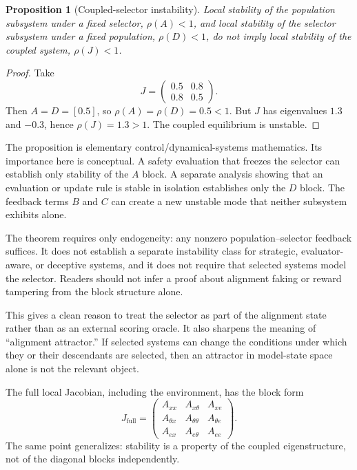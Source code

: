 \documentclass[11pt]{article}
\newtheorem{proposition}{Proposition}
\begin{document}
\begin{proposition}[Coupled-selector instability]
Local stability of the population subsystem under a fixed selector, $\rho(A)<1$, and local stability of the selector subsystem under a fixed population, $\rho(D)<1$, do not imply local stability of the coupled system, $\rho(J)<1$.
\end{proposition}

\begin{proof}
Take
\begin{equation}
    J=
    \begin{pmatrix}
    0.5 & 0.8\\
    0.8 & 0.5
    \end{pmatrix}.
\end{equation}
Then $A=D=[0.5]$, so $\rho(A)=\rho(D)=0.5<1$. But $J$ has eigenvalues $1.3$ and $-0.3$, hence $\rho(J)=1.3>1$. The coupled equilibrium is unstable.
\end{proof}

The proposition is elementary control/dynamical-systems mathematics. Its importance here is conceptual. A safety evaluation that freezes the selector can establish only stability of the $A$ block. A separate analysis showing that an evaluation or update rule is stable in isolation establishes only the $D$ block. The feedback terms $B$ and $C$ can create a new unstable mode that neither subsystem exhibits alone.

The theorem requires only endogeneity: any nonzero population--selector feedback suffices. It does not establish a separate instability class for strategic, evaluator-aware, or deceptive systems, and it does not require that selected systems model the selector. Readers should not infer a proof about alignment faking or reward tampering from the block structure alone.

This gives a clean reason to treat the selector as part of the alignment state rather than as an external scoring oracle. It also sharpens the meaning of ``alignment attractor.'' If selected systems can change the conditions under which they or their descendants are selected, then an attractor in model-state space alone is not the relevant object.

The full local Jacobian, including the environment, has the block form
\begin{equation}
J_{\mathrm{full}}=
\begin{pmatrix}
A_{xx} & A_{x\theta} & A_{xe}\\
A_{\theta x} & A_{\theta\theta} & A_{\theta e}\\
A_{ex} & A_{e\theta} & A_{ee}
\end{pmatrix}.
\end{equation}
The same point generalizes: stability is a property of the coupled eigenstructure, not of the diagonal blocks independently.
\end{document}
